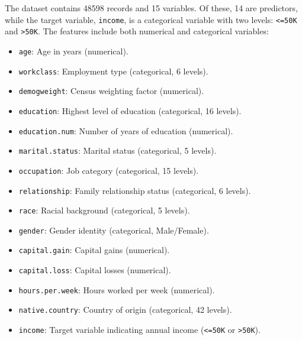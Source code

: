 \documentclass[
  11pt,
]{book}
\providecommand{\tightlist}{%
  \setlength{\itemsep}{0pt}\setlength{\parskip}{0pt}}
\theoremstyle{definition}
\theoremstyle{definition}
\theoremstyle{definition}
\theoremstyle{definition}
\theoremstyle{remark}
\begin{document}
The dataset contains 48598 records and 15 variables. Of these, 14 are predictors, while the target variable, \texttt{income}, is a categorical variable with two levels: \texttt{\textless{}=50K} and \texttt{\textgreater{}50K}. The features include both numerical and categorical variables:

\begin{itemize}
\tightlist
\item
  \texttt{age}: Age in years (numerical).\\
\item
  \texttt{workclass}: Employment type (categorical, 6 levels).\\
\item
  \texttt{demogweight}: Census weighting factor (numerical).\\
\item
  \texttt{education}: Highest level of education (categorical, 16 levels).\\
\item
  \texttt{education.num}: Number of years of education (numerical).\\
\item
  \texttt{marital.status}: Marital status (categorical, 5 levels).\\
\item
  \texttt{occupation}: Job category (categorical, 15 levels).\\
\item
  \texttt{relationship}: Family relationship status (categorical, 6 levels).\\
\item
  \texttt{race}: Racial background (categorical, 5 levels).\\
\item
  \texttt{gender}: Gender identity (categorical, Male/Female).\\
\item
  \texttt{capital.gain}: Capital gains (numerical).\\
\item
  \texttt{capital.loss}: Capital losses (numerical).\\
\item
  \texttt{hours.per.week}: Hours worked per week (numerical).\\
\item
  \texttt{native.country}: Country of origin (categorical, 42 levels).\\
\item
  \texttt{income}: Target variable indicating annual income (\texttt{\textless{}=50K} or \texttt{\textgreater{}50K}).
\end{itemize}
\end{document}
